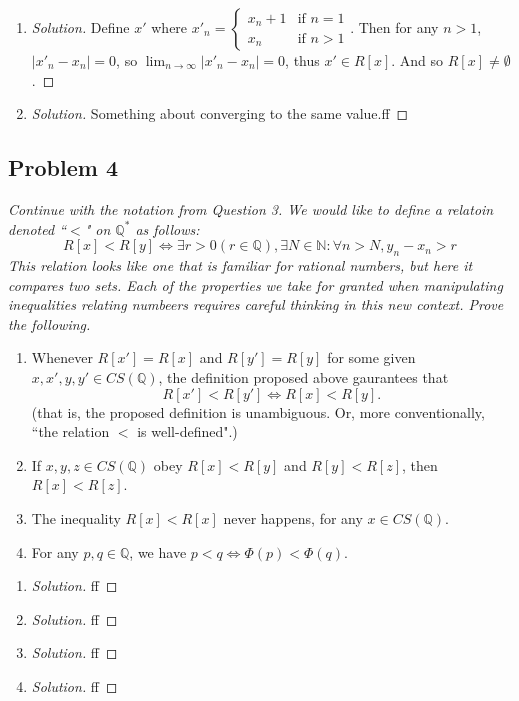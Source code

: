 \documentclass{article}
\newcommand{\N}{{\mathbb N}}
\newcommand{\Q}{{\mathbb Q}}
\begin{document}
\begin{enumerate}
	\item \begin{proof}[Solution]\let\qed\relax
		Define $x'$ where $x'_n = \begin{cases}
			x_n+1 &\text{if }n=1\\
			x_n &\text{if }n>1
		\end{cases}$.
		Then for any $n > 1$, $|x'_n - x_n| = 0$,
		so $\lim_{n\to\infty}|x'_n - x_n| = 0$,
		thus $x' \in R[x]$.
		And so $R[x] \neq \emptyset$.
	\end{proof}
	\item \begin{proof}[Solution]\let\qed\relax
		Something about converging to the same value.ff
	\end{proof}
\end{enumerate}
\clearpage

\subsection*{Problem 4}
{\it Continue with the notation from Question 3.
	We would like to define a relatoin denoted ``$<$" on $\Q^*$ as follows:
	\[
		R[x] < R[y] \iff \exists r > 0 (r \in \Q), \exists N \in \N
		\colon \forall n > N, y_n - x_n > r
	\]
	This relation looks like one that is familiar for rational numbers,
	but here it compares two \emph{sets}.
	Each of the properties we take for granted when manipulating inequalities
	relating numbeers requires careful thinking in this new context.
	Prove the following.
\begin{enumerate}
	\item Whenever $R[x'] = R[x]$ and $R[y'] = R[y]$
		for some given $x,x',y,y' \in CS(\Q)$,
		the definition proposed above gaurantees that
		\[
			R[x'] < R[y'] \iff R[x] < R[y].
		\]
		(that is, the proposed definition is unambiguous.
		Or, more conventionally,
		``the relation $<$ is well-defined".)
	\item If $x,y,z \in CS(\Q)$ obey $R[x] < R[y]$ and $R[y] < R[z]$,
		then $R[x] < R[z]$.
	\item The inequality $R[x] < R[x]$ never happens, for any $x \in CS(\Q)$.
	\item For any $p,q \in \Q$, we have $p<q \iff \Phi(p) < \Phi(q)$.
\end{enumerate}}

\begin{enumerate}
	\item \begin{proof}[Solution]\let\qed\relax
		ff
	\end{proof}
	\item \begin{proof}[Solution]\let\qed\relax
		ff
	\end{proof}
	\item \begin{proof}[Solution]\let\qed\relax
		ff
	\end{proof}
	\item \begin{proof}[Solution]\let\qed\relax
		ff
	\end{proof}
\end{enumerate}
\clearpage
\end{document}
